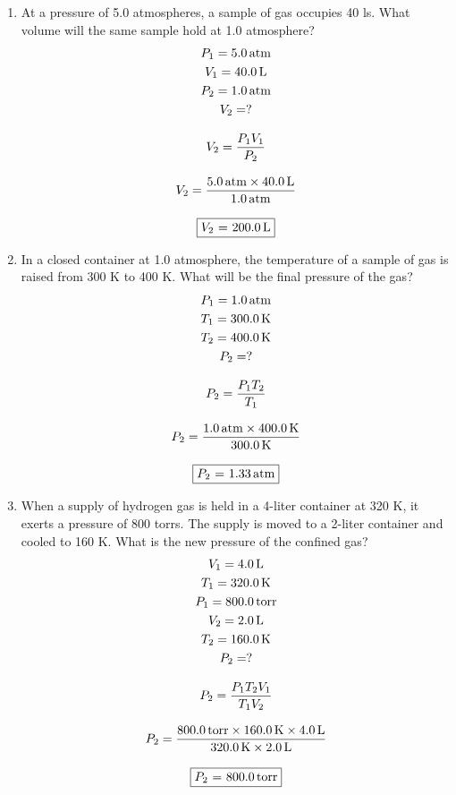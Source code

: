 \documentclass[12pt, a4paper]{article}
\begin{document}
\begin{enumerate}
	\item At a pressure of 5.0 atmospheres, a sample of gas occupies 40 ls. What volume will the same sample hold at 1.0 atmosphere? 
		\begin{gather*}
		P_1 = \SI{5.0}{atm}\\
		V_1 = \SI{40.0}{\l}\\
		P_2 = \SI{1.0}{atm}\\
		V_2 = ?\\[3mm]
		V_2 = \dfrac{P_1 V_1}{P_2}\\[3mm]
		V_2 = \dfrac{\SI{5.0}{atm} \times \SI{40.0}{\l}}{\SI{1.0}{atm}}\\[3mm]
		\fbox{$V_2$ = \SI{200.0}{\l}}
		\end{gather*}
	\item In a closed container at 1.0 atmosphere, the temperature of a sample of gas is raised from 300 K to 400 K. What will be the final pressure of the gas?
		\begin{gather*}
		P_1 = \SI{1.0}{atm}\\
		T_1 = \SI{300.0}{\kelvin}\\
		T_2 = \SI{400.0}{\kelvin}\\
		P_2 = ?\\[3mm]
		P_2 = \dfrac{P_1 T_2}{T_1}\\[3mm]
		P_2 = \dfrac{\SI{1.0}{atm} \times \SI{400.0}{\kelvin}}{\SI{300.0}{\kelvin}}\\[3mm]
		\fbox{$P_2$ = \SI{1.33}{atm}}
		\end{gather*}
	\item When a supply of hydrogen gas is held in a 4-liter container at 320 K, it exerts a pressure of 800 torrs. The supply is moved to a 2-liter container and cooled to 160 K. What is the new pressure of the confined gas? 
		\begin{gather*}
		V_1 = \SI{4.0}{\l}\\
		T_1 = \SI{320.0}{\kelvin}\\
		P_1 = \SI{800.0}{torr}\\
		V_2 = \SI{2.0}{\l}\\
		T_2 = \SI{160.0}{\kelvin}\\
		P_2 = ?\\[3mm]
		P_2 = \dfrac{P_1 T_2 V_1}{T_1 V_2}\\[3mm]
		P_2 = \dfrac{\SI{800.0}{torr} \times \SI{160.0}{\kelvin} \times \SI{4.0}{\l}}{\SI{320.0}{\kelvin} \times \SI{2.0}{\liter}}\\[3mm]
		\fbox{$P_2$ = \SI{800.0}{torr}}
		\end{gather*}

\end{enumerate}
\end{document}
